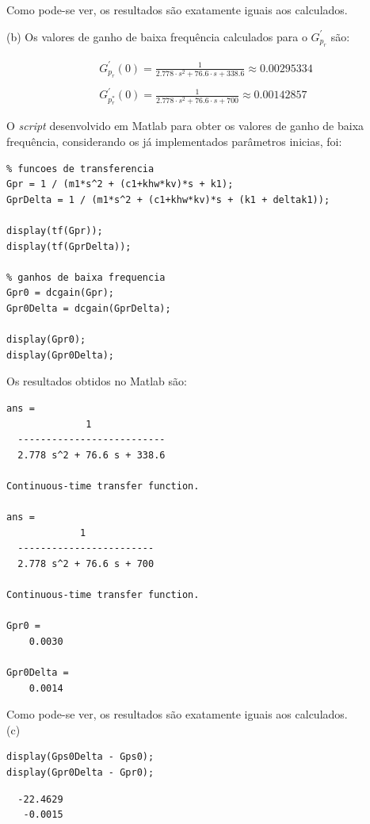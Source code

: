 \documentclass[a4paper,11pt]{article}
\begin{document}
Como pode-se ver, os resultados são exatamente iguais aos calculados.

\pagebreak

(b) Os valores de ganho de baixa frequência calculados para o $G^\prime_{p_r}$
são:

\begin{gather*}
    G^\prime_{p_r} \left( 0 \right) = \frac{1}{2.778 \cdot s^2 + 76.6 \cdot s +
        338.6} \approx 0.00295334 \\ \\
    G^\prime_{p_r^\ast} \left( 0 \right) = \frac{1}{2.778 \cdot s^2 + 76.6 \cdot
        s + 700} \approx 0.00142857
\end{gather*}

O \textit{script} desenvolvido em Matlab para obter os valores de ganho de baixa
frequência, considerando os já implementados parâmetros inicias, foi:

\begin{lstlisting}
% funcoes de transferencia
Gpr = 1 / (m1*s^2 + (c1+khw*kv)*s + k1);
GprDelta = 1 / (m1*s^2 + (c1+khw*kv)*s + (k1 + deltak1));

display(tf(Gpr));
display(tf(GprDelta));

% ganhos de baixa frequencia
Gpr0 = dcgain(Gpr);
Gpr0Delta = dcgain(GprDelta);

display(Gpr0);
display(Gpr0Delta);
\end{lstlisting}

Os resultados obtidos no Matlab são:

\begin{lstlisting}
ans =
              1
  --------------------------
  2.778 s^2 + 76.6 s + 338.6

Continuous-time transfer function.

ans =
             1
  ------------------------
  2.778 s^2 + 76.6 s + 700
 
Continuous-time transfer function.

Gpr0 =
    0.0030

Gpr0Delta =
    0.0014
\end{lstlisting}

Como pode-se ver, os resultados são exatamente iguais aos calculados. \\

(c)

\begin{lstlisting}
display(Gps0Delta - Gps0);
display(Gpr0Delta - Gpr0);
\end{lstlisting}
\begin{lstlisting}
  -22.4629
   -0.0015
\end{lstlisting}
\end{document}
